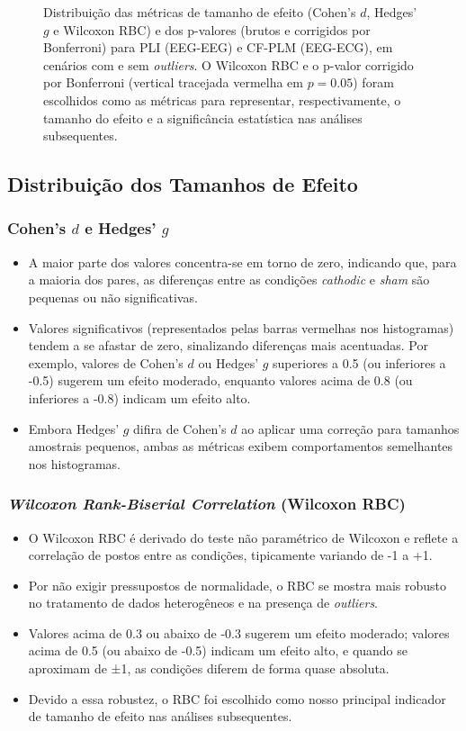 \begin{figure}[htb]
{    }
    \caption[Distribuições de tamanhos de efeito e p-valores]{Distribuição das métricas de tamanho de efeito (Cohen's \(d\), Hedges' \(g\)  e Wilcoxon RBC) e dos p-valores (brutos e corrigidos por Bonferroni) para PLI (EEG-EEG) e CF-PLM (EEG-ECG), em cenários com e sem \textit{outliers}. O Wilcoxon RBC e o p-valor corrigido por Bonferroni (vertical tracejada vermelha em $p=0.05$) foram escolhidos como as métricas para representar, respectivamente, o tamanho do efeito e a significância estatística nas análises subsequentes.}
    \label{fig:effectsizehist_all}    
\end{figure}

\subsection{Distribuição dos Tamanhos de Efeito}
\subsubsection{Cohen's \(d\) e Hedges' \(g\) }
\begin{itemize}
    \item A maior parte dos valores concentra-se em torno de zero, indicando que, para a maioria dos pares, as diferenças entre as condições \textit{cathodic} e \textit{sham} são pequenas ou não significativas.
    \item Valores significativos (representados pelas barras vermelhas nos histogramas) tendem a se afastar de zero, sinalizando diferenças mais acentuadas. Por exemplo, valores de Cohen's \(d\) ou Hedges' \(g\)  superiores a 0.5 (ou inferiores a -0.5) sugerem um efeito moderado, enquanto valores acima de 0.8 (ou inferiores a -0.8) indicam um efeito alto.
    \item Embora Hedges' \(g\)  difira de Cohen's \(d\) ao aplicar uma correção para tamanhos amostrais pequenos, ambas as métricas exibem comportamentos semelhantes nos histogramas.
\end{itemize}

\subsubsection{\textit{Wilcoxon Rank-Biserial Correlation} (Wilcoxon RBC)}
\begin{itemize}
    \item O Wilcoxon RBC é derivado do teste não paramétrico de Wilcoxon e reflete a correlação de postos entre as condições, tipicamente variando de -1 a +1.
    \item Por não exigir pressupostos de normalidade, o RBC se mostra mais robusto no tratamento de dados heterogêneos e na presença de \textit{outliers}.
    \item Valores acima de 0.3 ou abaixo de -0.3 sugerem um efeito moderado; valores acima de 0.5 (ou abaixo de -0.5) indicam um efeito alto, e quando se aproximam de ±1, as condições diferem de forma quase absoluta.
    \item Devido a essa robustez, o RBC foi escolhido como nosso principal indicador de tamanho de efeito nas análises subsequentes.
\end{itemize}

